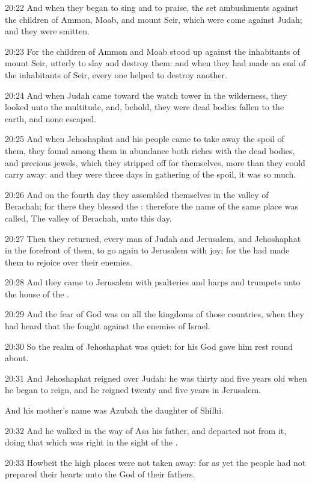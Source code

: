 20:22 And when they began to sing and to praise, the \LORD set
ambushments against the children of Ammon, Moab, and mount Seir, which
were come against Judah; and they were smitten.

20:23 For the children of Ammon and Moab stood up against the
inhabitants of mount Seir, utterly to slay and destroy them: and when
they had made an end of the inhabitants of Seir, every one helped to
destroy another.

20:24 And when Judah came toward the watch tower in the wilderness,
they looked unto the multitude, and, behold, they were dead bodies
fallen to the earth, and none escaped.

20:25 And when Jehoshaphat and his people came to take away the spoil
of them, they found among them in abundance both riches with the dead
bodies, and precious jewels, which they stripped off for themselves,
more than they could carry away: and they were three days in gathering
of the spoil, it was so much.

20:26 And on the fourth day they assembled themselves in the valley of
Berachah; for there they blessed the \LORD: therefore the name of the
same place was called, The valley of Berachah, unto this day.

20:27 Then they returned, every man of Judah and Jerusalem, and
Jehoshaphat in the forefront of them, to go again to Jerusalem with
joy; for the \LORD had made them to rejoice over their enemies.

20:28 And they came to Jerusalem with psalteries and harps and
trumpets unto the house of the \LORD.

20:29 And the fear of God was on all the kingdoms of those countries,
when they had heard that the \LORD fought against the enemies of
Israel.

20:30 So the realm of Jehoshaphat was quiet: for his God gave him rest
round about.

20:31 And Jehoshaphat reigned over Judah: he was thirty and five years
old when he began to reign, and he reigned twenty and five years in
Jerusalem.

And his mother's name was Azubah the daughter of Shilhi.

20:32 And he walked in the way of Asa his father, and departed not
from it, doing that which was right in the sight of the \LORD.

20:33 Howbeit the high places were not taken away: for as yet the
people had not prepared their hearts unto the God of their fathers.

